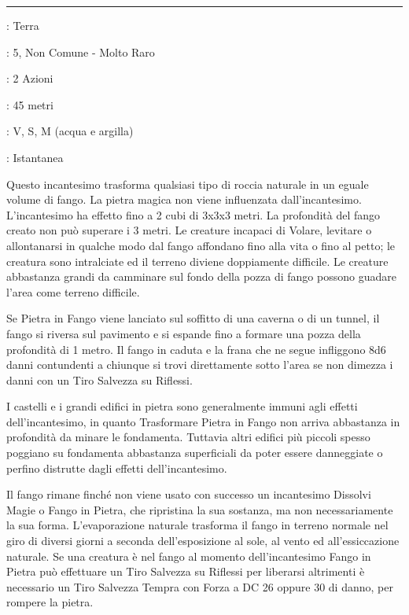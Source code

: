 \begin{multicols}{2}
\smallskip\noindent\rule{\linewidth}{2pt} \hypertarget{Pietra in Fango - Fango in Pietra}{}\smallskip{}
\noindent
\begin{description}[noitemsep, topsep=0pt, parsep=0pt, partopsep=0pt, leftmargin=0cm, labelwidth=2.8cm]
	\item[\textbf{Lista di Magia}]: Terra
	\item[\textbf{Livello}]: 5, Non Comune - Molto Raro
	\item[\textbf{T. di Lancio}]: 2 Azioni
	\item[\textbf{Gittata}]: 45 metri
	\item[\textbf{Componenti}]: V, S, M (acqua e argilla)
	\item[\textbf{Durata}]: Istantanea
\end{description}

Questo incantesimo trasforma qualsiasi tipo di roccia naturale in un eguale volume di fango. La pietra magica non viene influenzata dall'incantesimo. L'incantesimo ha effetto fino a 2 cubi di 3x3x3 metri. La profondità del fango creato non può superare i 3 metri. Le creature incapaci di Volare, levitare o allontanarsi in qualche modo dal fango affondano fino alla vita o fino al petto; le creatura sono intralciate ed il terreno diviene doppiamente difficile. Le creature abbastanza grandi da camminare sul fondo della pozza di fango possono guadare l'area come terreno difficile.

Se Pietra in Fango viene lanciato sul soffitto di una caverna o di un tunnel, il fango si riversa sul pavimento e si espande fino a formare una pozza della profondità di 1 metro. Il fango in caduta e la frana che ne segue infliggono 8d6 danni contundenti a chiunque si trovi direttamente sotto l'area se non dimezza i danni con un Tiro Salvezza su Riflessi.

I castelli e i grandi edifici in pietra sono generalmente immuni agli effetti dell'incantesimo, in quanto Trasformare Pietra in Fango non arriva abbastanza in profondità da minare le fondamenta. Tuttavia altri edifici più piccoli spesso poggiano su fondamenta abbastanza superficiali da poter essere danneggiate o perfino distrutte dagli effetti dell'incantesimo.

Il fango rimane finché non viene usato con successo un incantesimo Dissolvi Magie o Fango in Pietra, che ripristina la sua sostanza, ma non necessariamente la sua forma. L'evaporazione naturale trasforma il fango in terreno normale nel giro di diversi giorni a seconda dell'esposizione al sole, al vento ed all'essiccazione naturale.
Se una creatura è nel fango al momento dell'incantesimo Fango in Pietra può effettuare un Tiro Salvezza su Riflessi per liberarsi altrimenti è necessario un Tiro Salvezza Tempra con Forza a DC 26 oppure 30 di danno, per rompere la pietra.


\end{multicols}
